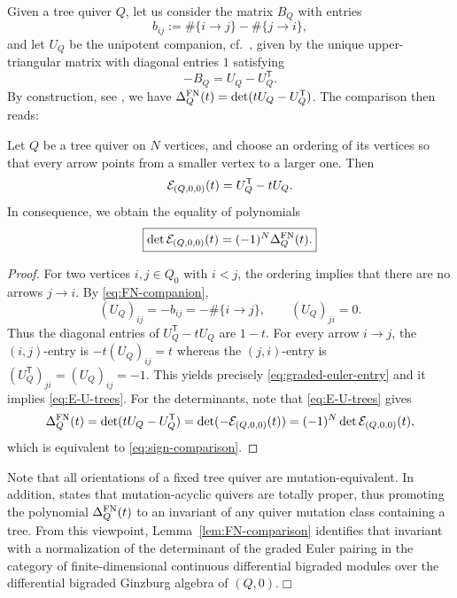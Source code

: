 \noindent Given a tree quiver $Q$, let us consider the matrix $B_Q$ with entries
\[
 b_{ij}:=\#\{i\to j\}-\#\{j\to i\},
\]
and let $U_Q$ be the unipotent companion, cf.~\cite[Def.~4.2]{FominNeville}, given by the unique upper-triangular matrix with diagonal entries $1$ satisfying
\begin{equation}\label{eq:FN-companion}
 -B_Q=U_Q-U_Q^{\mathsf T}.
\end{equation}
By construction, see \cite[Def.~8.1]{FominNeville}, we have $\Delta^{\mathrm{FN}}_Q(t)=\det(tU_Q-U_Q^{\mathsf T})$. The comparison then reads:

\begin{lemma}\label{lem:FN-comparison}
Let $Q$ be a tree quiver on $N$ vertices, and choose an ordering of its vertices so that every arrow points from a smaller vertex to a larger one. Then
\begin{equation}\label{eq:E-U-trees}
 \mathcal E_{(Q,0,0)}(t)=U_Q^{\mathsf T}-tU_Q.
\end{equation}
In consequence, we obtain the equality of polynomials
\begin{equation}\label{eq:sign-comparison}
 \boxed{\det\mathcal E_{(Q,0,0)}(t)=(-1)^N\Delta^{\mathrm{FN}}_Q(t).}
\end{equation}
\end{lemma}

\begin{proof}
For two vertices $i,j\in Q_0$ with $i<j$, the ordering implies that there are no arrows $j\to i$.  By \eqref{eq:FN-companion},
\[
 (U_Q)_{ij}=-b_{ij}=-\#\{i\to j\},
 \qquad (U_Q)_{ji}=0.
\]
Thus the diagonal entries of $U_Q^{\mathsf T}-tU_Q$ are $1-t$.  For every arrow $i\to j$, the $(i,j)$-entry is $-t(U_Q)_{ij}=t$ whereas the $(j,i)$-entry is
$(U_Q^{\mathsf T})_{ji}=(U_Q)_{ij}=-1$. This yields precisely \eqref{eq:graded-euler-entry} and it implies \eqref{eq:E-U-trees}. For the determinants, note that \eqref{eq:E-U-trees} gives
\[
 \Delta^{\mathrm{FN}}_Q(t)
 =\det(tU_Q-U_Q^{\mathsf T})
 =\det(-\mathcal E_{(Q,0,0)}(t))
 =(-1)^N\det\mathcal E_{(Q,0,0)}(t),
\]
which is equivalent to \eqref{eq:sign-comparison}.
\end{proof}

\begin{remark}
Note that all orientations of a fixed tree quiver are mutation-equivalent. In addition, \cite[Theorem 1.1]{Neville} states that mutation-acyclic quivers are totally proper, thus promoting the polynomial $\Delta^{\mathrm{FN}}_Q(t)$ to an invariant of any quiver mutation class containing a tree. From this viewpoint, Lemma~\ref{lem:FN-comparison} identifies that invariant with a normalization of the determinant of the graded Euler pairing in the category of finite-dimensional continuous differential bigraded modules over the differential bigraded Ginzburg algebra of $(Q,0)$.\hfill$\Box$
\end{remark}

